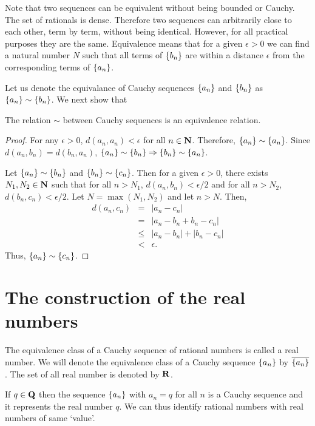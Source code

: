 Note that two sequences can be equivalent without being bounded or Cauchy.
The set of rationals is dense. Therefore two sequences can arbitrarily 
close to each other, term by term, without being identical. However, for
all practical purposes they are the same. Equivalence means that for a
given $\epsilon > 0$ we can find a natural number $N$ such that all terms
of $\{b_n\}$ are within a distance $\epsilon$ from the corresponding 
terms of $\{a_n\}$.

Let us denote the equivalance of Cauchy sequences $\{a_n\}$ and 
$\{b_n\}$ as $\{a_n\} \sim \{b_n\}$. We next show that
\begin{prop}\label{c4s2p1}
The relation $\sim$ between Cauchy sequences is an equivalence relation.
\end{prop}
\begin{proof}
For any $\epsilon > 0$, $d(a_n, a_n) < \epsilon$ for all $n \in \mathbf{N}$.
Therefore, $\{a_n\} \sim \{a_n\}$. Since $d(a_n, b_n) = d(b_n, a_n)$, 
$\{a_n\} \sim \{b_n\} \Rightarrow \{b_n\} \sim \{a_n\}$.

Let $\{a_n\} \sim \{b_n\}$ and $\{b_n\} \sim \{c_n\}$. Then for a
given $\epsilon > 0$, there exists $N_1, N_2 \in \mathbf{N}$ such that for all
$n > N_1$, $d(a_n, b_n) < \epsilon/2$ and for all $n > N_2$, $d(b_n, c_n)
< \epsilon/2$. Let $N = \max(N_1, N_2)$ and let $n > N$. Then,
\begin{eqnarray*}
d(a_n, c_n) &=& |a_n - c_n| \\
 &=& |a_n - b_n + b_n - c_n| \\
 &\le& |a_n - b_n| + |b_n - c_n| \\
 &<& \epsilon.
\end{eqnarray*}
Thus, $\{a_n\} \sim \{c_n\}$.
\end{proof}

\section{The construction of the real numbers}\label{c4s3}
\begin{defn}\label{c4s3d1}
The equivalence class of a Cauchy sequence of rational numbers is called 
a real number. We will denote the equivalence class of a Cauchy sequence
$\{a_n\}$ by $\overline{\{a_n\}}$. The set of all real number is 
denoted by $\mathbf{R}$.
\end{defn}

\begin{rem}
If $q \in \mathbf{Q}$ then the sequence $\{a_n\}$ with $a_n = q$ for all $n$
is a Cauchy sequence and it represents the real number $q$. We can thus
identify rational numbers with real numbers of same `value'.
\end{rem}

